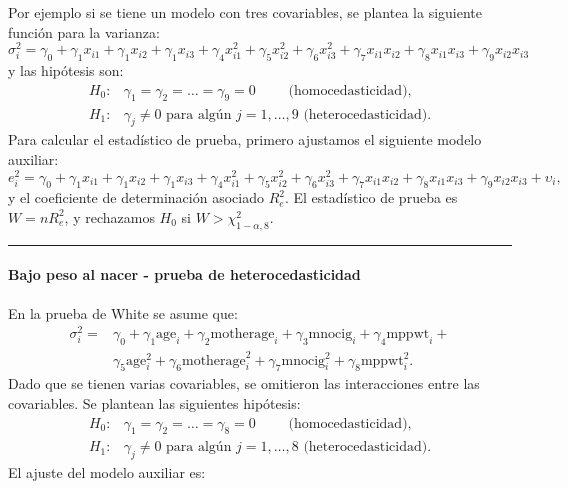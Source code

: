 \documentclass[
]{article}
\begin{document}
Por ejemplo si se tiene un modelo con tres covariables, se plantea la siguiente función para la varianza:
\[
\sigma^{2}_{i} = \gamma_{0} + \gamma_{1}x_{i1} + \gamma_{1}x_{i2}  + \gamma_{1}x_{i3} + \gamma_{4}x_{i1}^{2}+\gamma_{5}x_{i2}^{2} + \gamma_{6}x_{i3}^{2} + \gamma_{7}x_{i1}x_{i2} + \gamma_{8}x_{i1}x_{i3} + \gamma_{9}x_{i2}x_{i3}
\]
y las hipótesis son:
\begin{equation}
\begin{split}
H_{0}:& \gamma_{1} = \gamma_{2} = \ldots = \gamma_{9} = 0 \qquad \mbox{ (homocedasticidad)}, \\
H_{1}:& \gamma_{j}\neq 0 \mbox{ para algún }j=1,\ldots,9 \mbox{ (heterocedasticidad)}.    
\end{split}
\nonumber
\end{equation}
Para calcular el estadístico de prueba, primero ajustamos el siguiente modelo auxiliar:
\[
e_{i}^{2} = \gamma_{0} + \gamma_{1}x_{i1} + \gamma_{1}x_{i2}  + \gamma_{1}x_{i3} + \gamma_{4}x_{i1}^{2}+\gamma_{5}x_{i2}^{2} + \gamma_{6}x_{i3}^{2} + \gamma_{7}x_{i1}x_{i2} + \gamma_{8}x_{i1}x_{i3} + \gamma_{9}x_{i2}x_{i3} + \upsilon_{i},
\]
y el coeficiente de determinación asociado \(R_{e}^{2}\). El estadístico de prueba es \(W=nR_{e}^{2}\), y rechazamos \(H_{0}\) si \(W > \chi^{2}_{1-\alpha,8}\).

\rule{\textwidth}{0.4pt}

\hypertarget{bajo-peso-al-nacer---prueba-de-heterocedasticidad}{%
\paragraph*{Bajo peso al nacer - prueba de heterocedasticidad}\label{bajo-peso-al-nacer---prueba-de-heterocedasticidad}}

En la prueba de White se asume que:
\begin{equation}
\begin{split}
\sigma^{2}_{i} =& \gamma_{0} + \gamma_{1}\mbox{age}_{i} + \gamma_{2}\mbox{motherage}_{i}  + \gamma_{3}\mbox{mnocig}_{i} + \gamma_{4}\mbox{mppwt}_{i}+ \\
& \gamma_{5}\mbox{age}_{i}^{2} + \gamma_{6}\mbox{motherage}_{i}^{2}  + \gamma_{7}\mbox{mnocig}_{i}^{2} + \gamma_{8}\mbox{mppwt}_{i}^{2}.
\end{split}
\nonumber
\end{equation}
Dado que se tienen varias covariables, se omitieron las interacciones entre las covariables. Se plantean las siguientes hipótesis:
\begin{equation}
\begin{split}
H_{0}:& \gamma_{1} = \gamma_{2} = \ldots = \gamma_{8} = 0 \qquad \mbox{ (homocedasticidad)}, \\
H_{1}:& \gamma_{j}\neq 0 \mbox{ para algún }j=1,\ldots,8 \mbox{ (heterocedasticidad)}.
\end{split}
\nonumber
\end{equation}
El ajuste del modelo auxiliar es:
\end{document}
